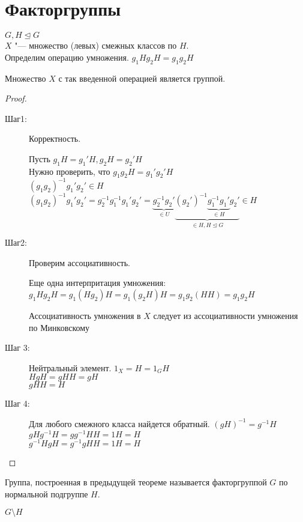 ﻿\section{Факторгруппы}
$G, H \unlhd G$\\
$X$ "--- множество (левых) смежных классов по $H$.\\
Определим операцию умножения. 
$g_1H g_2H = g_1g_2H$
\begin{theorem}
Множество $X$ с так введенной операцией является группой. 
\end{theorem}
\begin{proof}
\begin{description}
\item[Шаг1:]
Корректность. 

Пусть $g_1H = g_1'H, g_2H = g_2'H$\\
Нужно проверить, что $g_1g_2H = g_1'g_2'H$\\

$(g_1g_2)^{-1}g_1'g_2' \in H$\\
$(g_1g_2)^{-1}g_1'g_2' = g_2^{-1}g_1^{-1}g_1'g_2' = \underbrace{g_2^{-1}g_2'}_{\in U} \underbrace{(g_2')^{-1} \underbrace{g_1^{-1}g_1'}_{\in H}g_2'}_{\in H, H \unlhd G} \in H$\\
\item [Шаг2:]
Проверим ассоциативность.

Еще одна интерпритация умножения:
$g_1Hg_2H = g_1(Hg_2)H = g_1(g_2H)H = g_1g_2(HH) = g_1g_2H$


Ассоциативность умножения в $X$ следует  из ассоциативности умножения по Минковскому\\
\item [Шаг 3:]
Нейтральный элемент. 
$1_X = H = 1_GH$\\
$HgH = gHH = gH$\\
$gHH = H$\\
\item [Шаг 4:]
Для любого смежного класса найдется обратный. 
$(gH)^{-1} = g^{-1}H$\\
$gHg^{-1}H = gg^{-1}HH = 1H = H$\\
$g^{-1}HgH = g^{-1}gHH = 1H = H$\\
\end{description}
\end{proof}
\begin{Def}
Группа, построенная в предыдущей теореме называется факторгруппой $G$ по нормальной подгруппе $H$.

$G \setminus H$\\
\end{Def}

